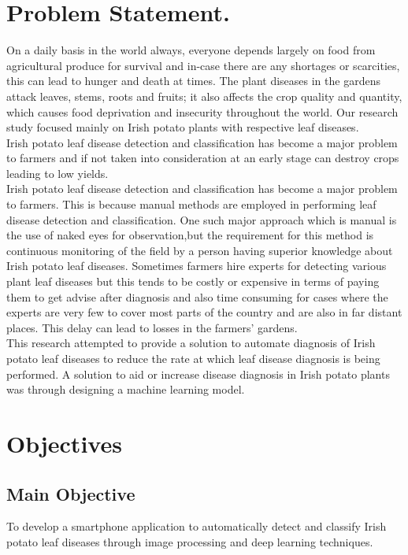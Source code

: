 \documentclass[11pt]{report}
\begin{document}
\section{Problem Statement.}
On a daily basis in the world always, everyone depends largely on food from agricultural produce for survival and in-case there are any shortages or scarcities, this can lead to hunger and death at times. The plant diseases in the gardens attack leaves, stems, roots and fruits; it also affects the crop quality and quantity, which causes food deprivation and insecurity throughout the world. Our research study focused mainly on Irish potato plants with respective leaf diseases.\\

Irish potato leaf disease detection and classification has become a major problem to farmers and if not taken into consideration at an early stage can destroy crops leading to low yields.\\

Irish potato leaf disease detection and classification has become a major problem to farmers. This is because manual methods are employed in performing leaf disease detection and classification. One such major approach which is manual is the use of naked eyes for observation,but the requirement for this method is continuous monitoring of the field by a person having superior knowledge about Irish potato leaf diseases. Sometimes farmers hire experts for detecting various plant leaf diseases but this tends to be costly or expensive in terms of paying them to get advise after diagnosis and also time consuming for cases where the experts are very few to cover most parts of the country and are also in far distant places. This delay can lead to losses in the farmers' gardens.\\

This research attempted to provide a solution to automate diagnosis of Irish potato leaf diseases to reduce the rate at which leaf disease diagnosis is being performed. A solution to aid or increase disease diagnosis in Irish potato plants was through designing a machine learning model.\\

\section{Objectives}
\subsection{Main Objective}
To develop a smartphone application to automatically detect and classify Irish potato leaf diseases through image processing and deep learning techniques.\\
\end{document}
